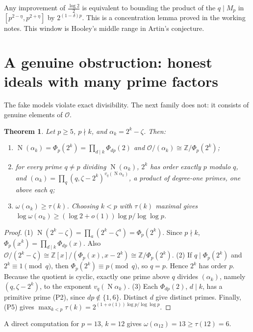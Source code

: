 \documentclass[11pt]{amsart}
\newtheorem{theorem}{Theorem}[section]
\theoremstyle{definition}
\theoremstyle{remark}
\newcommand{\cO}{\mathcal{O}}
\newcommand{\Z}{\mathbb{Z}}
\DeclareMathOperator{\Nm}{N}
\begin{document}
Any improvement of $\frac{\log 2}{2}$ is equivalent to bounding the product of the $q\mid M_p$ in
$[p^{2-\eta},p^{2+\eta}]$ by $2^{(1-\delta)p}$. This is a concentration lemma proved in the working notes.
This window is Hooley's middle range in Artin's conjecture.

\section{A genuine obstruction: honest ideals with many prime factors}
The fake models violate exact divisibility. The next family does not: it consists of genuine elements of $\cO$.

\begin{theorem}\label{thm:honest}
Let $p\ge5$, $p\nmid k$, and $\alpha_k=2^k-\zeta$. Then:
\begin{enumerate}
\item $\Nm(\alpha_k)=\Phi_p(2^k)=\prod_{d\mid k}\Phi_{dp}(2)$ and $\cO/(\alpha_k)\cong\Z/\Phi_p(2^k)$;
\item for every prime $q\ne p$ dividing $\Nm(\alpha_k)$, $2^k$ has order exactly $p$ modulo $q$, and
$(\alpha_k)=\prod_q(q,\zeta-2^k)^{v_q(\Nm\alpha_k)}$, a product of degree-one primes, one above each $q$;
\item $\omega(\alpha_k)\ge\tau(k)$. Choosing $k<p$ with $\tau(k)$ maximal gives
$\log\omega(\alpha_k)\ge(\log2+o(1))\log p/\log\log p$.
\end{enumerate}
\end{theorem}
\begin{proof}
(1) $\Nm(2^k-\zeta)=\prod_{a}(2^k-\zeta^a)=\Phi_p(2^k)$. Since $p\nmid k$, $\Phi_p(x^k)=\prod_{d\mid k}\Phi_{dp}(x)$. Also
$\cO/(2^k-\zeta)\cong\Z[x]/(\Phi_p(x),x-2^k)\cong\Z/\Phi_p(2^k)$.
(2) If $q\mid\Phi_p(2^k)$ and $2^k\equiv1\pmod q$, then $\Phi_p(2^k)\equiv p\pmod q$, so $q=p$. Hence $2^k$ has order
$p$. Because the quotient is cyclic, exactly one prime above $q$ divides $(\alpha_k)$, namely $(q,\zeta-2^k)$, to the
exponent $v_q(\Nm\alpha_k)$.
(3) Each $\Phi_{dp}(2)$, $d\mid k$, has a primitive prime (P2), since $dp\notin\{1,6\}$. Distinct $d$ give distinct
primes. Finally, (P5) gives $\max_{k<p}\tau(k)=2^{(1+o(1))\log p/\log\log p}$.
\end{proof}

A direct computation for $p=13$, $k=12$ gives $\omega(\alpha_{12})=13\ge\tau(12)=6$.
\end{document}
